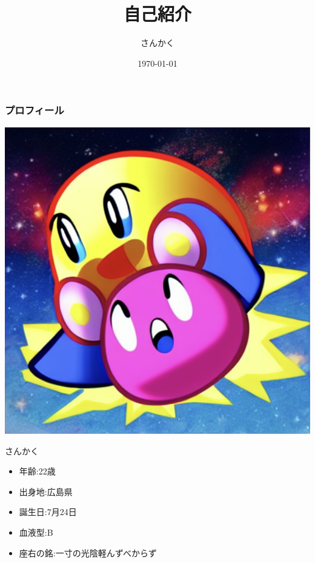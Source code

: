\documentclass[aspectratio=169, dvipdfmx, 11pt]{beamer} %
\title[さんかく]{\Huge 自己紹介}
\author[Zenn: \href{https://zenn.dev/joho0724}{@joho0724}]{\Large さんかく}
\institute[Qiita: \href{https://qiita.com/triangle0724}{@triangle0724}]{\large Zenn: \href{https://zenn.dev/joho0724}{@joho0724}}
\date{\today}
\begin{document}
\maketitle

\begin{frame}
    \frametitle{プロフィール}
    \begin{minipage}[t]{0.35\textwidth}
      \vspace{0pt}
      \centering
      \includegraphics[width=1.0\linewidth]{fig/triangle.jpg}\\
    \end{minipage}
    \begin{minipage}[t]{0.65\textwidth}
      \vspace{0pt}
      \hspace{0.5cm} %
      \huge
      さんかく
      \vspace{0.5cm} %
      \LARGE
      \begin{itemize}
        \item 年齢:22歳
        \item 出身地:広島県
        \item 誕生日:7月24日
        \item 血液型:B
        \item 座右の銘:一寸の光陰軽んずべからず
    \end{itemize}
    \end{minipage}
\end{frame}
\end{document}
